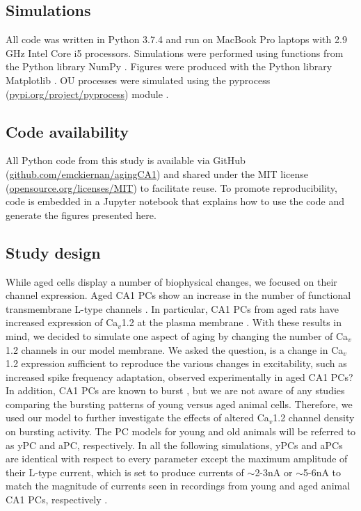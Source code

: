 \documentclass[12pt]{article}
\begin{document}
\subsection{Simulations}
All code was written in Python 3.7.4 and run on MacBook Pro laptops with 2.9 GHz Intel Core i5 processors. Simulations were performed using functions from the Python library NumPy \cite{numpyHarris2020}. Figures were produced with the Python library Matplotlib \cite{hunter2007matplotlib}. OU processes were simulated using the pyprocess (\href{https://pypi.org/project/pyprocess/}{pypi.org/project/pyprocess}) module \citep{mondaca200PyProcess}.

\subsection{Code availability}
All Python code from this study is available via GitHub (\href{https://github.com/emckiernan/agingCA1}{github.com/emckiernan/agingCA1}) and shared under the MIT license (\href{https://opensource.org/licenses/MIT}{opensource.org/licenses/MIT}) to facilitate reuse. To promote reproducibility, code is embedded in a Jupyter notebook \cite{perez2007ipython,kluyver2016jupyter} that explains how to use the code and generate the figures presented here.

\subsection{Study design}
While aged cells display a number of biophysical changes, we focused on their {\Ca} channel expression. Aged CA1 PCs show an increase in the number of functional transmembrane L-type {\Ca} channels  \citep{chen2000expression,herman1998up,thibault1996increase,veng2002regionally,veng2003age}. In particular, CA1 PCs from aged rats have increased expression of Ca$_v$1.2 at the plasma membrane \citep{nunez2014surface}. With these results in mind, we decided to simulate one aspect of aging by changing the number of Ca$_v$1.2 channels in our model membrane. We asked the question, is a change in Ca$_v$1.2 expression sufficient to reproduce the various changes in excitability, such as increased spike frequency adaptation, observed experimentally in aged CA1 PCs? In addition, CA1 PCs are known to burst \citep{mckiernan2017ca1}, but we are not aware of any studies comparing the bursting patterns of young versus aged animal cells. Therefore, we used our model to further investigate the effects of altered Ca$_v$1.2 channel density on bursting activity. The PC models for young and old animals will be referred to as yPC and aPC, respectively. In all the following simulations, yPCs and aPCs are identical with respect to every parameter except the maximum amplitude of their L-type {\Ca} current, which is set to produce currents of $\sim$2-3nA or $\sim$5-6nA to match the magnitude of currents seen in recordings from young and aged animal CA1 PCs, respectively \cite{campbell1996aging}. 
\end{document}
